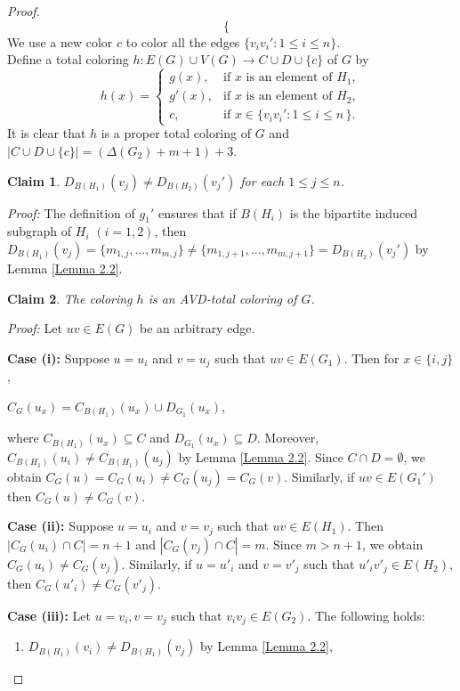 \documentclass[12pt]{article}
\theoremstyle{definition}
\newtheorem{claim}{Claim}
\begin{document}
\begin{proof}
\[\begin{cases}
\end{cases}
\]
We use a new color $c$ to color all the edges $\{v_iv_i':1\le i\leq n\}$.\\
Define a total coloring $h : E(G)\cup V(G)\rightarrow C \cup D \cup \{c\}$ of $G$ by
\[h(x)=
\begin{cases}
g(x), & \text{if } x \text{ is an element of } H_1,\\[1ex]
g'(x), & \text{if } x \text{ is an element of } H_2,\\[1ex]
c, & \text{if } x \in \{v_iv_i' : 1 \leq i \leq n\,\}.
\end{cases}
\]
It is clear that \(h\) is a proper total coloring of $G$ and $|C\cup D\cup \{c\}|=\left(\Delta(G_2)+m+1\right)+3$.

\begin{claim}\label{Claim 9}
{\em $D_{B(H_1)}(v_j)\neq D_{B(H_2)}(v_j')$ for each $1\leq j\leq n$.}
\end{claim}

\textit{Proof:}
The definition of $g_1'$ ensures that if $B(H_i)$ is the bipartite induced subgraph of $H_i$ $(i=1,2)$, then $D_{B(H_1)}(v_j)=\{m_{1,j},...,m_{m,j}\}\neq \{m_{1,j+1},...,m_{m,j+1}\}= D_{B(H_2)}(v_j')$ by Lemma \ref{Lemma 2.2}.    

\begin{claim}\label{Claim 10}
{\em The coloring $h$ is an AVD-total coloring of $G$.}
\end{claim}

\textit{Proof:}
Let $uv \in E(G)$ be an arbitrary edge. 

\textbf{Case (i):}
Suppose $u=u_i$ and $v=u_j$ such that $uv\in E(G_1)$.
Then for $x\in \{i,j\}$,
\begin{center}
    $C_G(u_x)=C_{B(H_1)}(u_x)\cup D_{G_1}(u_x)$,
\end{center}
where $C_{B(H_1)}(u_x)\subseteq C$ and $D_{G_1}(u_x)\subseteq D$. Moreover, $C_{B(H_1)}(u_i)\neq C_{B(H_1)}(u_j)$ by Lemma \ref{Lemma 2.2}.
Since $C\cap D=\emptyset$, we obtain $C_{G}(u)=C_G(u_i)\neq C_G(u_j)=C_{G}(v)$.
Similarly, if $uv\in E(G_1')$ then $C_G(u)\neq C_G(v)$.

\textbf{Case (ii):} 
Suppose $u=u_i$ and $v=v_j$ such that $uv\in E(H_1)$. 
Then $|C_G(u_i)\cap C|=n+1$ and
$|C_G(v_j)\cap C|=m$.
Since $m>n+1$, we obtain
$C_G(u_i)\neq C_G(v_j)$.
Similarly, if $u=u'_i$ and $v=v'_j$ such that $u'_iv'_j\in E(H_2)$, then $C_G(u'_i)\neq C_{G}(v'_j)$.     

\textbf{Case (iii):} 
Let $u=v_i, v=v_j$ such that $v_iv_j\in E(G_2)$. The following holds:
\begin{enumerate}
    \item $D_{B(H_1)}(v_i)\neq D_{B(H_1)}(v_j)$ by Lemma \ref{Lemma 2.2},
    

\end{enumerate}
\end{proof}
\end{document}
